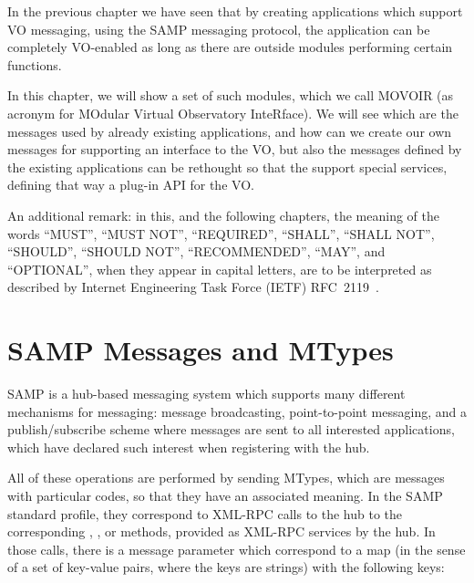 	
	In the previous chapter we have seen that by creating
	applications which support VO messaging, using the SAMP
	messaging protocol, the application can be completely
	VO-enabled as long as there are outside modules performing
	certain functions.
	
	 In this chapter, we will show a set of such modules, which we
	call MOVOIR (as acronym for MOdular Virtual Observatory
	InteRface). We will see which are the messages used by already
	existing applications, and how can we create our own messages
	for supporting an interface to the VO, but also the messages
	defined by the existing applications can be rethought so that
	the support special services, defining that way a plug-in API
	for the VO.
	
	 An additional remark: in this, and the following chapters,
	the meaning of the words “MUST”, “MUST NOT”,
	“REQUIRED”, “SHALL”, “SHALL  NOT”, “SHOULD”, “SHOULD NOT”,
	“RECOMMENDED”, “MAY”, and “OPTIONAL”, when they appear in
	capital letters, are to be interpreted as described by
	Internet Engineering Task Force (IETF)
	RFC~2119~\cite{
	rfc2119}.
	
	\section{SAMP Messages and MTypes} %
	\label{sec:samp_messages_mtypes}
		
		SAMP is a hub-based messaging system which supports many
		different mechanisms for messaging: message broadcasting,
		point-to-point messaging, and a publish/subscribe scheme
		where messages are sent to all interested applications,
		which have declared such interest when registering with
		the hub.
		
		All of these operations are performed by sending MTypes,
		which are messages with particular codes, so that they
		have an associated meaning. In the SAMP standard profile,
		they correspond to XML-RPC calls to the hub to the
		corresponding , , or
		 methods, provided as XML-RPC services by
		the hub. In those calls, there is a message parameter
		which correspond to a map (in the sense of a set of
		key-value pairs, where the keys are strings) with the
		following keys:
		
